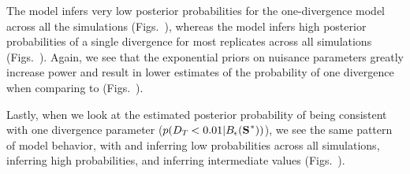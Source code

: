 \documentclass[letterpaper,12pt]{article}
\begin{document}
\begin{linenumbers}
The \modelUniform model infers very low posterior probabilities for the
one-divergence model across all the simulations (Figs.\
),
whereas the \modelOld model infers high posterior probabilities of a single
divergence for most replicates across all simulations (Figs.\
).
Again, we see that the exponential priors on nuisance parameters greatly
increase power and result in lower estimates of the probability of
one divergence when comparing \modelUshaped to \modelOld (Figs.\
).

Lastly, when we look at the estimated posterior probability of
\divTimeDispersion being consistent with one divergence parameter
($p(\divTimeDispersion < 0.01 | \ssSpace)$), we see the same pattern of model
behavior, with \modelDPP and \modelUniform inferring low probabilities across
all simulations, \modelOld inferring high probabilities, and \modelUshaped
inferring intermediate values (Figs.\
).


\end{linenumbers}
\end{document}
